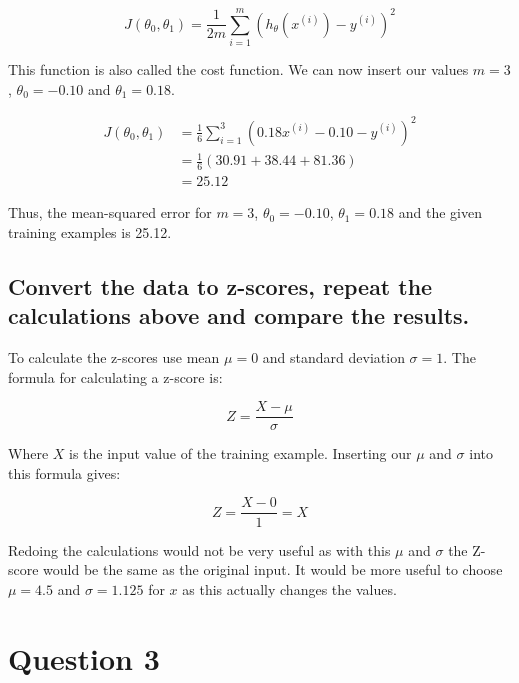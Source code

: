 \documentclass[12pt, a4paper]{article}
\begin{document}
		\begin{equation*}
		J(\theta_0, \theta_1) = \frac{1}{2m} \sum\limits_{i=1}^m (h _{\theta} (x ^{(i)}) - y ^{(i)})^2
		\end{equation*}
		
		This function is also called the cost function. We can now insert our values $m=3$, $\theta_0=-0.10$ and $\theta_1=0.18$.
		
		\begin{align*}
		J(\theta_0, \theta_1) &= \frac{1}{6} \sum\limits_{i=1}^3 (0.18x ^{(i)} - 0.10 - y ^{(i)})^2\\
		 &= \frac{1}{6} (30.91+38.44+81.36)\\
		&=25.12
		\end{align*}
		
		Thus, the mean-squared error for $m=3$, $\theta_0=-0.10$, $\theta_1=0.18$ and the given training examples is 25.12.
	
	\subsection{Convert the data to z-scores, repeat the calculations above and compare the results.}
	To calculate the z-scores use mean $\mu=0$ and standard deviation $\sigma=1$. The formula for calculating a z-score is:
	
	\begin{equation*}
	Z = \frac{X-\mu}{\sigma}
	\end{equation*}
	
	Where $X$ is the input value of the training example. Inserting our $\mu$ and $\sigma$ into this formula gives:
	
	\begin{equation*}
	Z = \frac{X-0}{1} = X
	\end{equation*}
	
	Redoing the calculations would not be very useful as with this $\mu$ and $\sigma$ the Z-score would be the same as the original input. It would be more useful to choose $\mu=4.5$ 
	and $\sigma=1.125$ for $x$ as this actually changes the values.

	\pagebreak

\section{Question 3}
\end{document}
